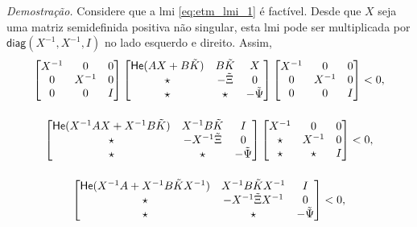 \noindent \textit{Demostração.} Considere que a \acrshort{lmi} \eqref{eq:etm_lmi_1} é factível. Desde que $X$ seja uma matriz semidefinida positiva não singular, esta \acrshort{lmi} pode ser multiplicada por $\mathsf{diag}(X^{-1}, X^{-1}, I)$ no lado esquerdo e direito. Assim, \begin{gather}
  \begin{bmatrix}
    X^{-1} & 0      & 0 \\
    0      & X^{-1} & 0 \\
    0      & 0      & I
  \end{bmatrix}
  \begin{bmatrix}
    \mathsf{He}(AX +B\tilde{K}) & B\tilde{K}   & X             \\
    \star                       & -\tilde{\Xi} & 0             \\
    \star                       & \star        & -\tilde{\Psi}
  \end{bmatrix}
  \begin{bmatrix}
    X^{-1} & 0      & 0 \\
    0      & X^{-1} & 0 \\
    0      & 0      & I
  \end{bmatrix}
  < 0, \notag \notag \\[12pt]
  \begin{bmatrix}
    \mathsf{He}(X^{-1}AX +X^{-1}B\tilde{K}) & X^{-1}B\tilde{K}   & I             \\
    \star                                   & -X^{-1}\tilde{\Xi} & 0             \\
    \star                                   & \star              & -\tilde{\Psi}
  \end{bmatrix}
  \begin{bmatrix}
    X^{-1} & 0      & 0 \\
    \star  & X^{-1} & 0 \\
    \star  & \star  & I
  \end{bmatrix}
  < 0, \notag \notag \\[12pt]
  \begin{bmatrix}
    \mathsf{He}(X^{-1}A +X^{-1}B\tilde{K}X^{-1}) & X^{-1}B\tilde{K}X^{-1}   & I             \\
    \star                                        & -X^{-1}\tilde{\Xi}X^{-1} & 0             \\
    \star                                        & \star                    & -\tilde{\Psi}
  \end{bmatrix}
  < 0,

\end{gather}

